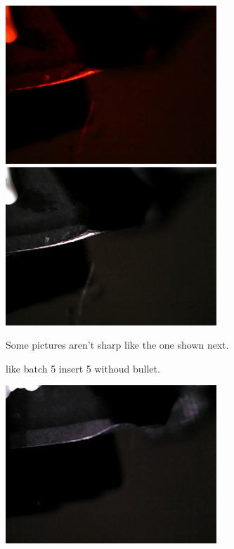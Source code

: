 \includegraphics[width=3.125000in, keepaspectratio=true]{./fig/Vision/Dataset/automated_datasets/2_created_datasets/2_Spaghetti_dataset/b_003_p_006_l_006-011_red_nb.png}\includegraphics[width=3.125000in, keepaspectratio=true]{./fig/Vision/Dataset/automated_datasets/2_created_datasets/2_Spaghetti_dataset/b_003_p_006_l_006-011_white_nb.png}



Some pictures aren't sharp like the one shown next.

like batch 5 insert 5 withoud bullet.

\includegraphics[width=3.125000in, keepaspectratio=true]{./fig/Vision/Dataset/automated_datasets/2_created_datasets/2_Spaghetti_dataset/b_005_p_005_l_006-011_white_nb.png}



